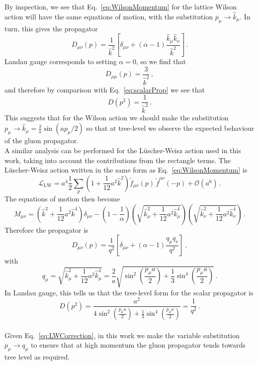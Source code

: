 %
By inspection, we see that Eq.~\eqref{eq:WilsonMomentum} for the lattice Wilson action will have the same equations of motion, with the substitution $p_\mu\rightarrow \hat{k}_\mu$. In turn, this gives the propagator
%
\begin{equation}
D_{\mu\nu}(p) = \frac{1}{\hat{k}^2}\left[\delta_{\mu\nu} + (\alpha-1)\frac{\hat{k}_\mu \hat{k}_\nu}{\hat{k}^2}\right]\, .
\end{equation}
Landau gauge corresponds to setting $\alpha=0$, so we find that
%
\begin{equation}
D_{\mu\mu}(p) = \frac{3}{\hat{k}^2}\, ,
\end{equation}
%
and therefore by comparison with Eq.~\eqref{eq:scalarProp} we see that
%
\begin{equation}
D(p^2) = \frac{1}{\hat{k}^2}\, .
\end{equation}
%
This suggests that for the Wilson action we should make the substitution $p_\mu\rightarrow \hat{k}_\mu = \frac{2}{a}\sin\left(a p_\mu/2\right)$ so that at tree-level we observe the expected behaviour of the gluon propagator.\\

A similar analysis can be performed for the L\"uscher-Weisz action used in this work, taking into account the contributions from the rectangle terms. The L\"uscher-Weisz action written in the same form as Eq.~\eqref{eq:WilsonMomentum} is~\cite{Weisz:1982zw}
%
\begin{equation}
\mathcal{L}_\text{LW} = a^4\frac{1}{2}\sum_p \left(1+\frac{1}{12}a^2\hat{k}^2\right) \tilde{f}_{\mu\nu}(p) \, \tilde{f}^{\mu\nu}(-p) + \mathcal{O}(a^6)\, .
\end{equation}
%
The equations of motion then become
%
\begin{equation}
M_{\mu\nu} = \left(\hat{k}^2 + \frac{1}{12}a^2\hat{k}^4\right)\delta_{\mu\nu} - \left(1-\frac{1}{\alpha}\right)\left(\sqrt{\hat{k}_\mu^2 + \frac{1}{12}a^2\hat{k}_\mu^4}\right)\left(\sqrt{\hat{k}_\nu^2 + \frac{1}{12}a^2\hat{k}_\nu^4}\right)\, .
\end{equation}
Therefore the propagator is
%
\begin{equation}
D_{\mu\nu}(p) = \frac{1}{q^2}\left[\delta_{\mu\nu} + (\alpha-1)\frac{q_\mu q_\nu}{q^2}\right]\, ,
\end{equation}
with
\begin{equation}
q_\mu = \sqrt{\hat{k}_\mu^2 + \frac{1}{12}a^2\hat{k}_\mu^4} = \frac{2}{a}\sqrt { \sin ^ { 2 } \left( \frac { p _ { \mu } a } { 2 } \right) + \frac { 1 } { 3 } \sin ^ { 4 } \left( \frac { p _ { \mu } a } { 2 } \right) }\, .
\end{equation}
%
In Landau gauge, this tells us that the tree-level form for the scalar propagator is
%
\begin{equation}
D(p^2) = \frac{a^2}{4 \sin ^ { 2 } \left( \frac { p _ { \mu } a } { 2 } \right) + \frac { 1 } { 3 } \sin ^ { 4 } \left( \frac { p _ { \mu } a } { 2 } \right)} = \frac{1}{q^2}\, .
\label{eq:LWCorrection}
\end{equation}\\
Given Eq.~\eqref{eq:LWCorrection}, in this work we make the variable substitution $p_\mu\rightarrow q_\mu$ to ensure that at high momentum the gluon propagator tends towards tree level as required.

